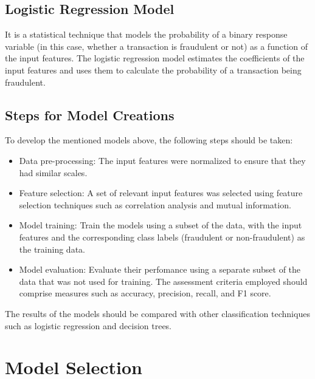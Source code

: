 \subsection{Logistic Regression Model}

It is a statistical technique that models the probability of a binary response variable (in this 
case, whether a transaction is fraudulent or not) as a function of the input features. The logistic regression 
model estimates the coefficients of the input features and uses them to calculate the probability of a transaction 
being fraudulent.

\subsection{Steps for Model Creations}
To develop the mentioned models above, the following steps should be taken:
\begin{itemize}
\item Data pre-processing: The input features were normalized to ensure that they had similar scales.
\item Feature selection: A set of relevant input features was selected using feature selection techniques such as 
correlation analysis and mutual information.
\item Model training: Train the models using a subset of the data, with the input features and the 
corresponding class labels (fraudulent or non-fraudulent) as the training data.
\item Model evaluation: Evaluate their perfomance using a separate subset of the data that was 
not used for training. The assessment criteria employed should comprise measures such as accuracy, precision, 
recall, and F1 score.\\
\end{itemize}
The results of the models should be compared with other classification techniques such as logistic regression 
and decision trees.

\section{Model Selection}
